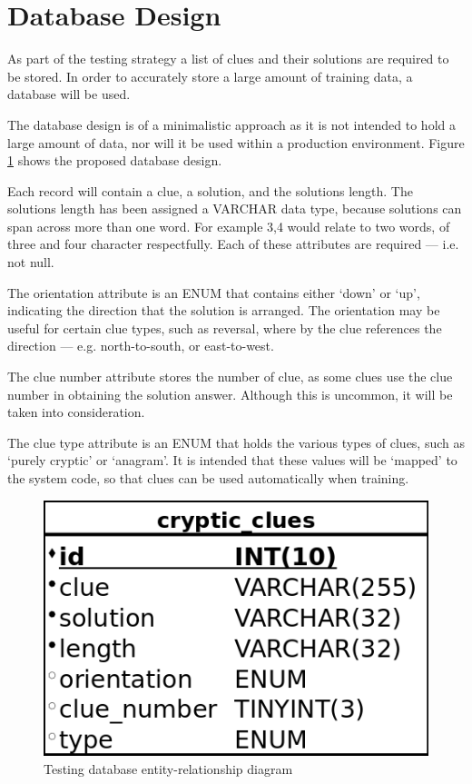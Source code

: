 \section{Database Design}
\label{sec:database_design}

As part of the testing strategy a list of clues and their solutions are required
to be stored. In order to accurately store a large amount of training data, a 
database will be used.

The database design is of a minimalistic approach as it is not intended to hold
a large amount of data, nor will it be used within a production environment. 
Figure \ref{fig:database_erd} shows the proposed database design.

Each record will contain a clue, a solution, and the solutions length. The
solutions length has been assigned a VARCHAR data type, because solutions can
span across more than one word. For example 3,4 would relate to two words, of
three and four character respectfully. Each of these attributes are required ---
i.e. not null.

The orientation attribute is an ENUM that contains either `down' or `up', 
indicating the direction that the solution is arranged. The orientation may be 
useful for certain clue types, such as reversal, where by the clue references 
the direction --- e.g. north-to-south, or east-to-west.

The clue number attribute stores the number of clue, as some clues use the clue 
number in obtaining the solution answer. Although this is uncommon, it will be 
taken into consideration.

The clue type attribute is an ENUM that holds the various types of clues, 
such as `purely cryptic' or `anagram'. It is intended that these values will be 
`mapped' to the system code, so that clues can be used automatically when 
training.

\begin{figure}[H]
  \centering
  \includegraphics[scale=0.5]{database/database.png}
  \caption{Testing database entity-relationship diagram}
  \label{fig:database_erd}
\end{figure}
